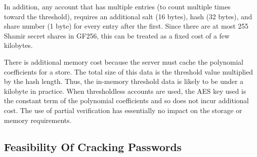 In addition, any account that has 
multiple entries (to count multiple times toward the threshold), requires an 
additional salt (16 bytes), hash (32 bytes), and share number (1 byte)
for every entry after the first.
Since there are at most 255 Shamir secret shares in GF256, this can be treated 
as a fixed cost of a few kilobytes.

There is additional memory cost because the server must cache
the polynomial coefficients for a store.   The total
size of this data is the threshold value multiplied by the hash length.
Thus, the in-memory threshold data is likely to be under a 
kilobyte in practice.%
When thresholdless accounts are used, the AES key used is the 
constant term 
of the polynomial coefficients and so does not incur additional cost.
The use of partial verification has essentially no impact on the storage or 
memory requirements.





%


\subsection{Feasibility Of Cracking Passwords}
\label{sec-feasibility}

